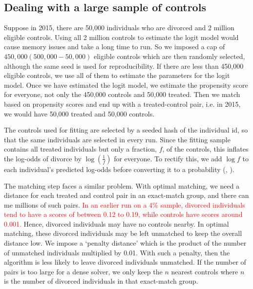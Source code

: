 \documentclass[a4paper,12pt]{article}
\theoremstyle{plain}
\theoremstyle{definition}
\theoremstyle{TheoremNum}
\theoremstyle{CorollaryNum}
\theoremstyle{PropositionNum}
\theoremstyle{TheoremNum}
\begin{document}
\subsection*{Dealing with a large sample of controls}
\makeatletter
\def\@currentlabelname{Dealing with a large sample of controls}
\makeatother
\label{app:control_limitation_500_000}

Suppose in 2015, there are 50,000 individuals who are divorced and 2 million eligible controls. Using all 2 million controls to estimate the logit model would cause memory issues and take a long time to run. So we imposed a cap of $450,000 (500,000 - 50,000)$ eligible controls which are then randomly selected, although the same seed is used for reproducibility. If there are less than 450,000 eligible controls, we use all of them to estimate the parameters for the logit model. Once we have estimated the logit model, we estimate the propensity score for everyone, not only the 450,000 controls and 50,000 treated. Then we match based on propensity scores and end up with a treated-control pair, i.e. in 2015, we would have 50,000 treated and 50,000 controls.

The controls used for fitting are selected by a seeded hash of the individual id, so that the same individuals are selected in every run. Since the fitting sample contains all treated individuals but only a fraction, $f$, of the controls, this inflates the log-odds of divorce by $\log(\frac{1}{f})$ for everyone. To rectify this, we add $\log f$ to each individual's predicted log-odds before converting it to a probability (\citeauthor{king2001logistic}, \citeyear{king2001logistic}). 

The matching step faces a similar problem. With optimal matching, we need a distance for each treated and control pair in an exact-match group, and there can me millions of such pairs. \textcolor{red}{In an earlier run on a 4\% sample, divorced individuals tend to have a scores of between 0.12 to 0.19, while controls have scores around 0.001.} Hence, divorced individuals may have no controls nearby. In optimal matching, these divorced individuals may be left unmatched to keep the overall distance low. We impose a `penalty distance' which is the product of the number of unmatched individuals multiplied by 0.01. With such a penalty, then the algorithm is less likely to leave divorced individuals unmatched. If the number of pairs is too large for a dense solver, we only keep the $n$ nearest controls where $n$ is the number of divorced individuals in that exact-match group. 
\end{document}
